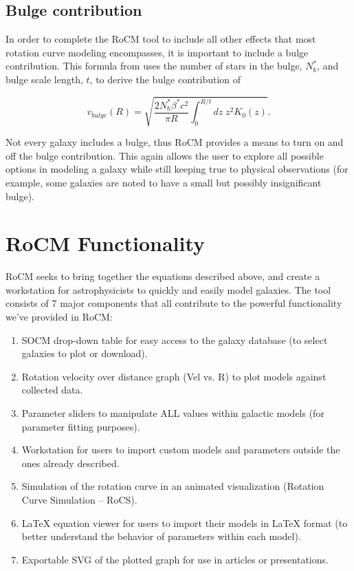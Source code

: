 \documentclass[conference]{IEEEtran-modified}
\begin{document}
\subsection{Bulge contribution}
In order to complete the RoCM tool to include all other effects that most rotation curve modeling encompasses, it is important to include a bulge contribution.  This formula from \cite{mannheim} uses the number of stars in the bulge, $N^*_b$, and bulge scale length, $t$, to derive the bulge contribution of

\begin{equation}
v_{bulge}(R) = \sqrt{\frac{2 N^*_b\beta^* c^2}{\pi R} \int_0^{R/t} dz\; z^2K_0(z)}.
\end{equation}

Not every galaxy includes a bulge, thus RoCM provides a means to turn on and off the bulge contribution.  This again allows the user to explore all possible options in modeling a galaxy while still keeping true to physical observations (for example, some galaxies are noted to have a small but possibly insignificant bulge).


\section{RoCM Functionality}\label{rocm_func}
RoCM seeks to bring together the equations described above, and create a workstation for astrophysicists to quickly and easily model galaxies. The tool consists of 7 major components that all contribute to the powerful functionality we've provided in RoCM:
\begin{enumerate}
       \item SOCM drop-down table for easy access to the galaxy database (to select galaxies to plot or download).
       \item Rotation velocity over distance graph (Vel vs. R) to plot models against collected data.
       \item Parameter sliders to manipulate ALL values within galactic models (for parameter fitting purposes).
       \item Workstation for users to import custom models and parameters outside the ones already described.
       \item Simulation of the rotation curve in an animated visualization (Rotation Curve Simulation -- RoCS).
       \item LaTeX equation viewer for users to import their models in LaTeX format (to better understand the behavior of parameters within each model).
       \item Exportable SVG of the plotted graph for use in articles or presentations.
\end{enumerate}
\end{document}
